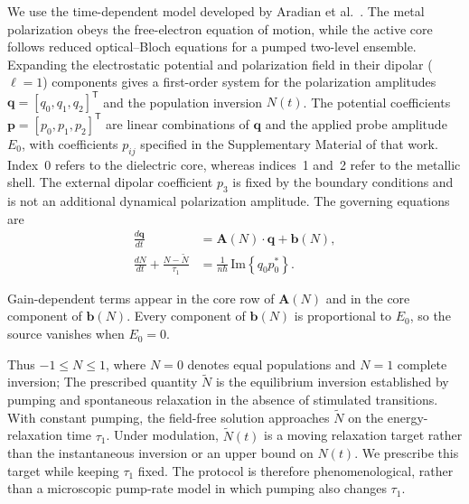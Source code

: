 \documentclass{optica-article}
\begin{document}
We use the time-dependent model developed by Aradian et al.~\cite{Aradian:2024}. The metal polarization obeys the free-electron equation of motion, while the active core follows reduced optical--Bloch equations for a pumped two-level ensemble. Expanding the electrostatic potential and polarization field in their dipolar ($\ell=1$) components gives a first-order system for the polarization amplitudes $\mathbf q=[q_{0},q_{1},q_{2}]^{\mathsf T}$ and the population inversion $N(t)$. The potential coefficients $\mathbf p=[p_{0},p_{1},p_{2}]^{\mathsf T}$ are linear combinations of $\mathbf q$ and the applied probe amplitude $E_0$, with coefficients $p_{ij}$ specified in the Supplementary Material of that work. Index~0 refers to the dielectric core, whereas indices~1 and~2 refer to the metallic shell. The external dipolar coefficient $p_3$ is fixed by the boundary conditions and is not an additional dynamical polarization amplitude. The governing equations are
\begin{align}
\frac{d\mathbf q}{dt} &= \mathbf A(N)\!\cdot\!\mathbf q + \mathbf b(N), \label{eq:qmastereq}\\
\frac{dN}{dt}+\frac{N-\widetilde{N}}{\tau_1} &= \frac{1}{n\hbar}\,\mathrm{Im}\!\left\{q_0 p_0^*\right\}. \label{eq:Nmastereq}
\end{align}

 Gain-dependent terms appear in the core row of $\mathbf A(N)$ and in the core component of $\mathbf b(N)$. Every component of $\mathbf b(N)$ is proportional to $E_0$, so the source vanishes when $E_0=0$.

 Thus $-1\leq N\leq1$, where $N=0$ denotes equal populations and $N=1$ complete inversion;  The prescribed quantity $\widetilde N$ is the equilibrium inversion established by pumping and spontaneous relaxation in the absence of stimulated transitions. With constant pumping, the field-free solution approaches $\widetilde N$ on the energy-relaxation time $\tau_1$. Under modulation, $\widetilde N(t)$ is a moving relaxation target rather than the instantaneous inversion or an upper bound on $N(t)$. We prescribe this target while keeping $\tau_1$ fixed. The protocol is therefore phenomenological, rather than a microscopic pump-rate model in which pumping also changes $\tau_1$.
\end{document}

